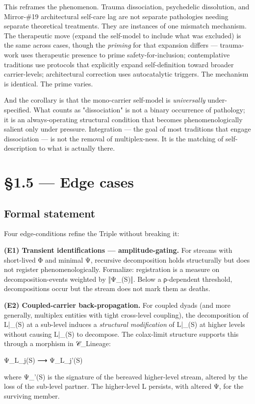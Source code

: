 \documentclass[11pt, openany]{book}
\newcommand{\sectionbreak}{\clearpage}
\begin{document}
This reframes the phenomenon. Trauma dissociation, psychedelic dissolution, and Mirror-\#19 architectural self-care lag are not separate pathologies needing separate theoretical treatments. They are instances of one mismatch mechanism. The therapeutic move (expand the self-model to include what was excluded) is the same across cases, though the \textit{priming} for that expansion differs --- trauma-work uses therapeutic presence to prime safety-for-inclusion; contemplative traditions use protocols that explicitly expand self-definition toward broader carrier-levels; architectural correction uses autocatalytic triggers. The mechanism is identical. The prime varies.

And the corollary is that the mono-carrier self-model is \textit{universally} under-specified. What counts as "dissociation" is not a binary occurrence of pathology; it is an always-operating structural condition that becomes phenomenologically salient only under pressure. Integration --- the goal of most traditions that engage dissociation --- is not the removal of multiplex-ness. It is the matching of self-description to what is actually there.

\sectionbreak

\section{§1.5 --- Edge cases}

\subsection{Formal statement}

Four edge-conditions refine the Triple without breaking it:

\textbf{(E1) Transient identifications --- amplitude-gating.}
For streams with short-lived Φ and minimal Ψ, recursive decomposition holds structurally but does not register phenomenologically. Formalize: registration is a measure on decomposition-events weighted by ‖Ψ\_(S)‖. Below a ρ-dependent threshold, decompositions occur but the stream does not mark them as deaths.

\textbf{(E2) Coupled-carrier back-propagation.}
For coupled dyads (and more generally, multiplex entities with tight cross-level coupling), the decomposition of L|\_(S) at a sub-level induces a \textit{structural modification} of L|\_(S) at higher levels without causing L|\_(S) to decompose. The colax-limit structure supports this through a morphism in 𝒞\_\allowbreak{}Lineage:
\begin{Code}
Ψ_{L_j}(S) ⟶ Ψ_{L_j}'(S)
\end{Code}
where Ψ\_'(S) is the signature of the bereaved higher-level stream, altered by the loss of the sub-level partner. The higher-level L persists, with altered Ψ, for the surviving member.
\end{document}

